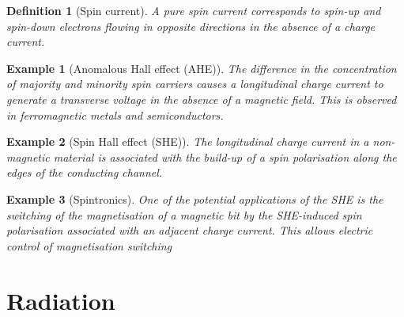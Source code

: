 \documentclass[a4paper]{article}
\newtheorem{eg}{Example}[section]
\theoremstyle{new}
\newtheorem{defi}{Definition}[section]
\begin{document}
\begin{defi}[Spin current]
A pure spin current corresponds to spin-up and spin-down electrons flowing in opposite directions in the absence of a charge current.
\end{defi}
\begin{eg}[Anomalous Hall effect (AHE)]
The difference in the concentration of majority and minority spin carriers causes a longitudinal charge current to generate a transverse voltage in the absence of a magnetic field. This is observed in ferromagnetic metals and semiconductors.
\end{eg}
\begin{eg}[Spin Hall effect (SHE)]
The longitudinal charge current in a non-magnetic material is associated with the build-up of a spin polarisation along the edges of the conducting channel.
\end{eg}
\begin{eg}[Spintronics]
One of the potential applications of the SHE is the switching of the magnetisation of a magnetic bit by the SHE-induced spin polarisation associated with an adjacent charge current. This allows electric control of magnetisation switching
\end{eg}
\newpage
\section{Radiation}
\end{document}
